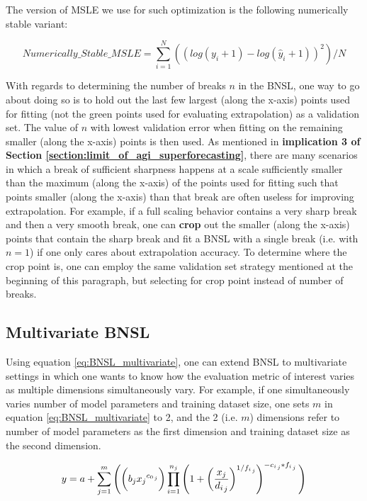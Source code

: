 \documentclass{article} %
\begin{document}
The version of MSLE we use for such optimization is the following numerically stable variant:

\[Numerically\_Stable\_MSLE = \sum_{i=1}^{N} ((log(y_{i}+1)-log(\hat{y}_{i}+1))^2)/N\] 

With regards to determining the number of breaks $n$ in the BNSL, one way to go about doing so is to hold out the last few largest (along the x-axis) points used for fitting (not the green points used for evaluating extrapolation) as a validation set. The value of $n$ with lowest validation error when fitting on the remaining smaller (along the x-axis) points is then used. As mentioned in \textbf{implication 3 of Section \ref{section:limit_of_agi_superforecasting}}, there are many scenarios in which a break of sufficient sharpness happens at a scale sufficiently smaller than the maximum (along the x-axis) of the points used for fitting such that points smaller (along the x-axis) than that break are often useless for improving extrapolation. For example, if a full scaling behavior contains a very sharp break and then a very smooth break, one can \textbf{crop} out the smaller (along the x-axis) points that contain the sharp break and fit a BNSL with a single break (i.e. with $n=1$) if one only cares about extrapolation accuracy. To determine where the crop point is, one can employ the same validation set strategy mentioned at the beginning of this paragraph, but selecting for crop point instead of number of breaks.

\iffalse

\subsection{Multivariate BNSL}
\label{section:BNSL_multivariate}

Using equation \ref{eq:BNSL_multivariate}, one can extend BNSL to multivariate settings in which one wants to know how the evaluation metric of interest varies as multiple dimensions simultaneously vary. For example, if one simultaneously varies number of model parameters and training dataset size, one sets $m$ in equation \ref{eq:BNSL_multivariate} to 2, and the 2 (i.e. $m$) dimensions refer to number of model parameters as the first dimension and training dataset size as the second dimension.

\begin{equation}
\vspace{-0.05in}
y =  a + \sum_{j=1}^{m}\Bigg(\bigg(b_j{x_j}^{{{c_0}_{}}_j}\bigg) \prod_{i=1}^{n_j} \left(1 + \left(\frac{x_j}{{{d_i}_{}}_j}\right)^{{1/{{f_i}_{}}}_j}\right)^{-{{c_i}_{}}_j * {{f_i}_{}}_j}\Bigg)
\label{eq:BNSL_multivariate}
\end{equation}
\end{document}
